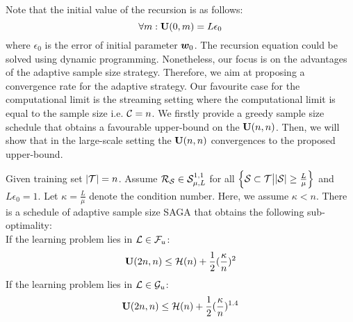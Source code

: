  Note
that the initial value of the recursion is as follows: 
\begin{equation*}
	\forall m: \mathbf U(0,m) = L \epsilon_0 
\end{equation*}
where $\epsilon_0$ is the error of initial parameter $\bm{w}_0$. 
 The recursion equation could be solved using dynamic
 programming. Nonetheless, our focus is on the advantages of the adaptive sample
 size strategy.
Therefore, we aim at proposing a convergence rate for the adaptive strategy.
Our favourite case for the computational limit is the streaming setting where
the computational limit is equal to the sample size i.e. ${\cal C} = n$. We firstly
provide a greedy sample size schedule that obtains a favourable upper-bound on
the $\mathbf U(n,n)$. Then, we will show that in the large-scale setting the
$\mathbf U(n,n)$ convergences to the proposed upper-bound.
\begin{lemma} \label{lemma:bound_on_u}
	Given training set $|{\cal T}| = n$. Assume ${\cal R}_{{\cal S}} \in
	{\cal S}_{\mu,L}^{1,1}$ for all $\left\{ {\cal S} \subset {\cal T} \big\vert |{\cal S}| \geq \frac{L}{\mu}
	\right\} $ and $L \epsilon_0 = 1$. Let $\kappa = \frac{L}{\mu}$ denote the
	condition number. Here, we assume $\kappa<n$.
	There is a schedule of adaptive sample size SAGA that obtains the
	following sub-optimality:\\
	If the learning problem lies in ${\cal L} \in {\cal F}_{u}$:  
	\begin{equation*}
		\mathbf U(2n,n) \leq {\cal H}(n) + \frac{1}{2}(\frac{\kappa}{ n})^2
	\end{equation*}
	If the learning problem lies in ${\cal L} \in {\cal G}_{u}$: 
	\begin{equation*}
		\mathbf U(2n,n) \leq {\cal H}(n) + \frac{1}{2}(\frac{\kappa}{n})^{1.4}
	\end{equation*}
\end{lemma}
